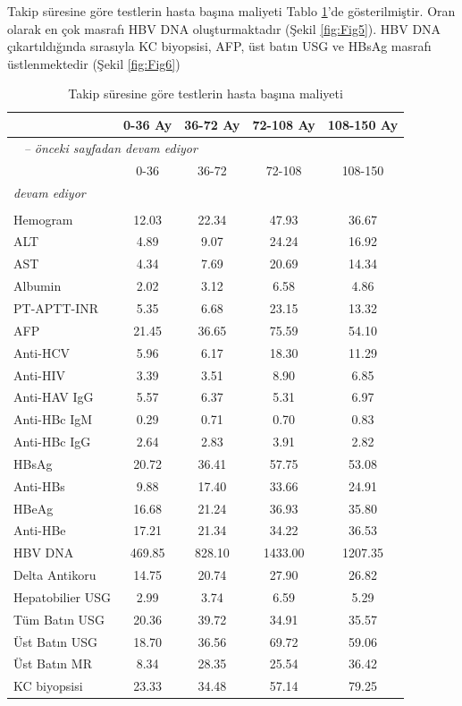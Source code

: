   
  
Takip süresine göre testlerin hasta başına maliyeti Tablo \ref{tablo:tlhasta}'de gösterilmiştir. Oran olarak en çok masrafı HBV DNA oluşturmaktadır (Şekil \ref{fig:Fig5}). HBV DNA çıkartıldığında sırasıyla KC biyopsisi, AFP, üst batın USG ve HBsAg masrafı üstlenmektedir (Şekil \ref{fig:Fig6}) 
   
  
  \begin{longtable}{lcccc}\caption{Takip süresine göre testlerin hasta başına maliyeti} \label{tablo:tlhasta}\\
        \hline
          & 0-36 Ay & 36-72 Ay & 72-108 Ay & 108-150 Ay \\ 
    
       
        \hline
        \endfirsthead
        \multicolumn{5}{l}{\tablename\ \thetable{} \textit{-- önceki sayfadan devam ediyor}}\\
        \hline
          & 0-36 & 36-72 & 72-108 & 108-150 \\ 
        \hline
       
        \endhead
        \hline
        \multicolumn{5}{l}{\textit{devam ediyor}} \\
        \endfoot
        \multicolumn{3}{l}{}  \\
        \endlastfoot
  Hemogram & 12.03 & 22.34 & 47.93 & 36.67 \\ 
  ALT & 4.89 & 9.07 & 24.24 & 16.92 \\ 
  AST & 4.34 & 7.69 & 20.69 & 14.34 \\ 
  Albumin & 2.02 & 3.12 & 6.58 & 4.86 \\ 
  PT-APTT-INR & 5.35 & 6.68 & 23.15 & 13.32 \\
  AFP & 21.45 & 36.65 & 75.59 & 54.10 \\
  Anti-HCV & 5.96 & 6.17 & 18.30 & 11.29 \\ 
  Anti-HIV & 3.39 & 3.51 & 8.90 & 6.85 \\ 
  Anti-HAV IgG & 5.57 & 6.37 & 5.31 & 6.97 \\
  Anti-HBc IgM & 0.29 & 0.71 & 0.70 & 0.83 \\ 
  Anti-HBc IgG & 2.64 & 2.83 & 3.91 & 2.82 \\   
  HBsAg & 20.72 & 36.41 & 57.75 & 53.08 \\ 
  Anti-HBs & 9.88 & 17.40 & 33.66 & 24.91 \\ 
  HBeAg & 16.68 & 21.24 & 36.93 & 35.80 \\ 
  Anti-HBe & 17.21 & 21.34 & 34.22 & 36.53 \\ 
  HBV DNA & 469.85 & 828.10 & 1433.00 & 1207.35 \\ 
  Delta Antikoru & 14.75 & 20.74 & 27.90 & 26.82 \\ 
  Hepatobilier USG & 2.99 & 3.74 & 6.59 & 5.29 \\ 
  Tüm Batın USG & 20.36 & 39.72 & 34.91 & 35.57 \\ 
  Üst Batın USG & 18.70 & 36.56 & 69.72 & 59.06 \\ 
  Üst Batın MR & 8.34 & 28.35 & 25.54 & 36.42 \\ 
  KC biyopsisi & 23.33 & 34.48 & 57.14 & 79.25 \\
   \hline
                      \end{longtable}
